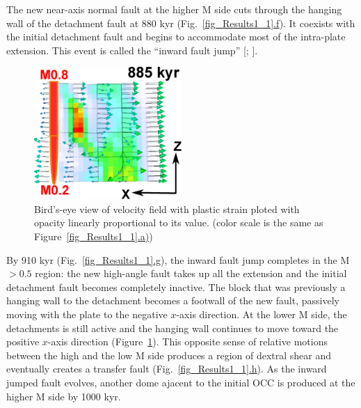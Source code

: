 The new near-axis normal fault at the higher M side cuts through the hanging wall of the detachment fault at 880 kyr (Fig.~\hyperref[fig_Results1_1]{\ref{fig_Results1_1}.f}). It coexists with the initial detachment fault and begins to accommodate most of the intra-plate extension. This event is called the ``inward fault jump'' [\citealp{Tucholke1998}; \citealp{Dick2008}].  %

\begin{figure}[h]
  \centering
    \includegraphics[width=0.5\textwidth]{./Figures/fig_Results_1_velocity_field.eps}
  \caption{Bird's-eye view of velocity field with plastic strain ploted with opacity linearly proportional to its value. (color scale is the same as Figure~\hyperref[fig_Results1_1]{\ref{fig_Results1_1}.a)})}
 \label{fig_Results_1_velocity_field}
\end{figure}


By 910 kyr (Fig.~\hyperref[fig_Results1_1]{\ref{fig_Results1_1}.g}), the inward fault jump completes in the M $> 0.5$ region: the new high-angle fault takes up all the extension and the initial detachment fault becomes completely inactive. The block that was previously a hanging wall to the detachment becomes a footwall of the new fault, passively moving with the plate to the negative $x$-axis direction. At the lower M side, the detachments is still active and the hanging wall continues to move toward the positive $x$-axis direction (Figure~\hyperref[fig_Results_1_velocity_field]{\ref{fig_Results_1_velocity_field}}). This opposite sense of relative motions between the high and the low M side produces a region of dextral shear and eventually creates a transfer fault (Fig.~\hyperref[fig_Results1_1]{\ref{fig_Results1_1}.h}). %
As the inward jumped fault evolves, another dome ajacent to the initial OCC is produced at the higher M side by 1000 kyr.%



